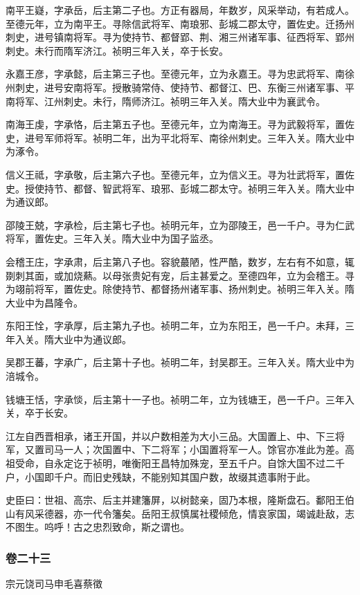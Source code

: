 \documentclass[]{article}
\begin{document}
南平王嶷，字承岳，后主第二子也。方正有器局，年数岁，风采举动，有若成人。至德元年，立为南平王。寻除信武将军、南琅邪、彭城二郡太守，置佐史。迁扬州刺史，进号镇南将军。寻为使持节、都督郢、荆、湘三州诸军事、征西将军、郢州刺史。未行而隋军济江。祯明三年入关，卒于长安。

永嘉王彦，字承懿，后主第三子也。至德元年，立为永嘉王。寻为忠武将军、南徐州刺史，进号安南将军。授散骑常侍、使持节、都督江、巴、东衡三州诸军事、平南将军、江州刺史。未行，隋师济江。祯明三年入关。隋大业中为襄武令。

南海王虔，字承恪，后主第五子也。至德元年，立为南海王。寻为武毅将军，置佐史，进号军师将军。祯明二年，出为平北将军、南徐州刺史。三年入关。隋大业中为涿令。

信义王祗，字承敬，后主第六子也。至德元年，立为信义王。寻为壮武将军，置佐史。授使持节、都督、智武将军、琅邪、彭城二郡太守。祯明三年入关。隋大业中为通议郎。

邵陵王兢，字承检，后主第七子也。祯明元年，立为邵陵王，邑一千户。寻为仁武将军，置佐史。三年入关。隋大业中为国子监丞。

会稽王庄，字承肃，后主第八子也。容貌蕞陋，性严酷，数岁，左右有不如意，辄剟刺其面，或加烧爇。以母张贵妃有宠，后主甚爱之。至德四年，立为会稽王。寻为翊前将军，置佐史。除使持节、都督扬州诸军事、扬州刺史。祯明三年入关。隋大业中为昌隆令。

东阳王恮，字承厚，后主第九子也。祯明二年，立为东阳王，邑一千户。未拜，三年入关。隋大业中为通议郎。

吴郡王蕃，字承广，后主第十子也。祯明二年，封吴郡王。三年入关。隋大业中为涪城令。

钱塘王恬，字承惔，后主第十一子也。祯明二年，立为钱塘王，邑一千户。三年入关，卒于长安。

江左自西晋相承，诸王开国，并以户数相差为大小三品。大国置上、中、下三将军，又置司马一人；次国置中、下二将军；小国置将军一人。馀官亦准此为差。高祖受命，自永定讫于祯明，唯衡阳王昌特加殊宠，至五千户。自馀大国不过二千户，小国即千户。而旧史残缺，不能别知其国户数，故缀其遗事附于此。

史臣曰：世祖、高宗、后主并建籓屏，以树懿亲，固乃本根，隆斯盘石。鄱阳王伯山有风采德器，亦一代令籓矣。岳阳王叔慎属社稷倾危，情哀家国，竭诚赴敌，志不图生。呜呼！古之忠烈致命，斯之谓也。

\hypertarget{header-n4919}{%
\subsubsection{卷二十三}\label{header-n4919}}

宗元饶司马申毛喜蔡徵
\end{document}
